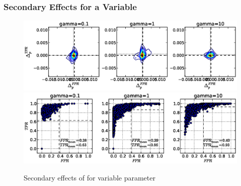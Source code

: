 \clearpage
\subsubsection{Secondary Effects for a Variable }

\begin{figure}[!h]
\begin{center}
\includegraphics[width=6in]{../fig/final/delta_hist_sec/cmpr_window/gamma}
\includegraphics[width=5.5in]{../fig/final/position/all_allowed/cmpr_window/gamma}
\end{center}
\caption{\label{fig:delta_sec6} Secondary effects of  for
  variable parameter }
\end{figure}


